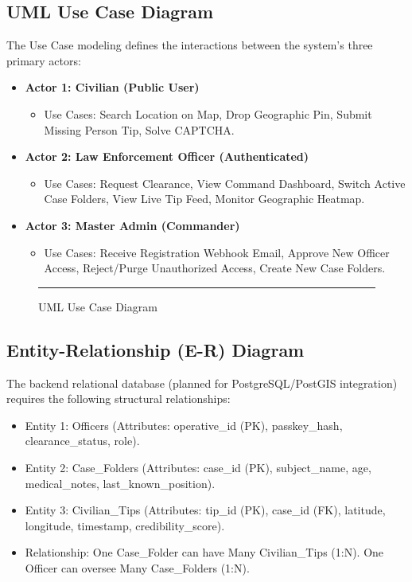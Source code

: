 \documentclass[12pt,a4paper]{report}
\begin{document}
\subsection{UML Use Case Diagram}
The Use Case modeling defines the interactions between the system's three primary actors:
\begin{itemize}
    \item \textbf{Actor 1: Civilian (Public User)} 
    \begin{itemize}
        \item Use Cases: Search Location on Map, Drop Geographic Pin, Submit Missing Person Tip, Solve CAPTCHA.
    \end{itemize}
    \item \textbf{Actor 2: Law Enforcement Officer (Authenticated)} 
    \begin{itemize}
        \item Use Cases: Request Clearance, View Command Dashboard, Switch Active Case Folders, View Live Tip Feed, Monitor Geographic Heatmap.
    \end{itemize}
    \item \textbf{Actor 3: Master Admin (Commander)} 
    \begin{itemize}
        \item Use Cases: Receive Registration Webhook Email, Approve New Officer Access, Reject/Purge Unauthorized Access, Create New Case Folders.
    \end{itemize}
\end{itemize}

\begin{figure}[H]
    \centering
    \rule{10cm}{6cm} %
    \caption{UML Use Case Diagram}
\end{figure}

\subsection{Entity-Relationship (E-R) Diagram}
The backend relational database (planned for PostgreSQL/PostGIS integration) requires the following structural relationships:
\begin{itemize}
    \item Entity 1: Officers (Attributes: operative\_id (PK), passkey\_hash, clearance\_status, role).
    \item Entity 2: Case\_Folders (Attributes: case\_id (PK), subject\_name, age, medical\_notes, last\_known\_position).
    \item Entity 3: Civilian\_Tips (Attributes: tip\_id (PK), case\_id (FK), latitude, longitude, timestamp, credibility\_score).
    \item Relationship: One Case\_Folder can have Many Civilian\_Tips (1:N). One Officer can oversee Many Case\_Folders (1:N).
\end{itemize}
\end{document}
